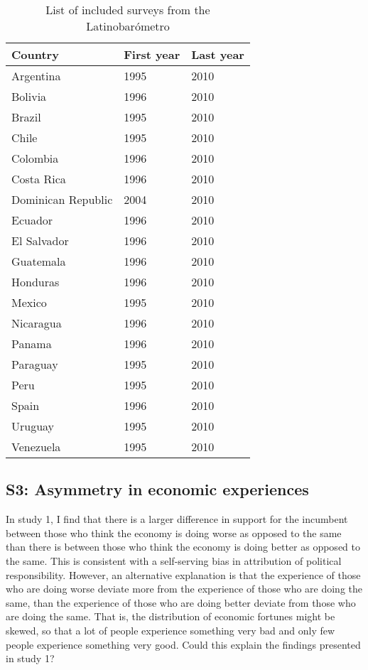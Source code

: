 \documentclass[a4paper,11pt]{article}
\begin{document}
	
	\begin{table}[htbp]\centering \footnotesize
		\caption{List of included surveys from the Latinobarómetro}\begin{tabular} {p{40mm}P{40mm}P{40mm}} \hline \hline
			\textbf{     Country } & \textbf{       First year} & \textbf{       Last year} \\
			\hline 
			Argentina  &       1995 &       2010 \\ 
			Bolivia  &       1996 &       2010 \\ 
			Brazil  &       1995 &       2010 \\ 
			Chile  &       1995 &       2010 \\ 
			Colombia  &       1996 &       2010 \\ 
			Costa Rica  &       1996 &       2010 \\
			Dominican Republic  &       2004 &       2010 \\ 
			Ecuador  &       1996 &       2010 \\ 
			El Salvador  &       1996 &       2010 \\ 
			Guatemala  &       1996 &       2010 \\ 
			Honduras  &       1996 &       2010 \\ 
			Mexico  &       1995 &       2010 \\ 
			Nicaragua  &       1996 &       2010 \\ 
			Panama  &       1996 &       2010 \\ 
			Paraguay  &       1995 &       2010 \\ 
			Peru  &       1995 &       2010 \\
			Spain  &       1996 &       2010 \\
			Uruguay  &       1995 &       2010 \\
			Venezuela  &       1995 &       2010 \\ \hline \hline
		\end{tabular}
		\label{latin}
	\end{table}
	
	
	\newpage
	
	
	
	
	\subsection*{S3: Asymmetry in economic experiences }
	
	In study 1, I find that there is a larger difference in support for the incumbent between those who think the economy is doing worse as opposed to the same than there is between those who think the economy is doing better as opposed to the same. This is consistent with a self-serving bias in attribution of political responsibility. However, an alternative explanation is that the experience of those who are doing worse deviate more from the experience of those who are doing the same, than the experience of those who are doing better deviate from those who are doing the same. That is, the distribution of economic fortunes might be skewed, so that a lot of people experience something very bad and only few people experience something very good. Could this explain the findings presented in study 1?
	
\end{document}
